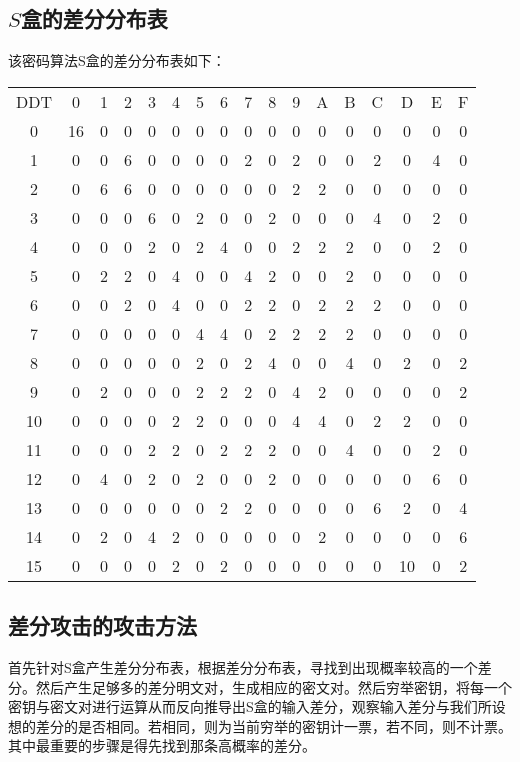 \documentclass{article}
\begin{document}
\subsection*{$S$盒的差分分布表}
该密码算法S盒的差分分布表如下：


\begin{tabular}{ccccccccccccccccc}
DDT &0  &1  &2  &3  &4  &5  &6  &7  &8  &9  &A  &B  &C  &D  &E  &F\\
0   &16 &0  &0  &0  &0  &0  &0  &0  &0  &0  &0  &0  &0  &0  &0  &0\\
1   &0  &0  &6  &0  &0  &0  &0  &2  &0  &2  &0  &0  &2  &0  &4  &0\\
2   &0  &6  &6  &0  &0  &0  &0  &0  &0  &2  &2  &0  &0  &0  &0  &0\\
3   &0  &0  &0  &6  &0  &2  &0  &0  &2  &0  &0  &0  &4  &0  &2  &0\\
4   &0  &0  &0  &2  &0  &2  &4  &0  &0  &2  &2  &2  &0  &0  &2  &0\\
5   &0  &2  &2  &0  &4  &0  &0  &4  &2  &0  &0  &2  &0  &0  &0  &0\\
6   &0  &0  &2  &0  &4  &0  &0  &2  &2  &0  &2  &2  &2  &0  &0  &0\\
7   &0  &0  &0  &0  &0  &4  &4  &0  &2  &2  &2  &2  &0  &0  &0  &0\\
8   &0  &0  &0  &0  &0  &2  &0  &2  &4  &0  &0  &4  &0  &2  &0  &2\\
9   &0  &2  &0  &0  &0  &2  &2  &2  &0  &4  &2  &0  &0  &0  &0  &2\\
10  &0  &0  &0  &0  &2  &2  &0  &0  &0  &4  &4  &0  &2  &2  &0  &0\\
11  &0  &0  &0  &2  &2  &0  &2  &2  &2  &0  &0  &4  &0  &0  &2  &0\\
12  &0  &4  &0  &2  &0  &2  &0  &0  &2  &0  &0  &0  &0  &0  &6  &0\\
13  &0  &0  &0  &0  &0  &0  &2  &2  &0  &0  &0  &0  &6  &2  &0  &4\\
14  &0  &2  &0  &4  &2  &0  &0  &0  &0  &0  &2  &0  &0  &0  &0  &6\\
15  &0  &0  &0  &0  &2  &0  &2  &0  &0  &0  &0  &0  &0  &10 &0  &2

\end{tabular}
\subsection*{差分攻击的攻击方法}
首先针对S盒产生差分分布表，根据差分分布表，寻找到出现概率较高的一个差分。然后产生足够多的差分明文对，生成相应的密文对。然后穷举密钥，将每一个密钥与密文对进行运算从而反向推导出S盒的输入差分，观察输入差分与我们所设想的差分的是否相同。若相同，则为当前穷举的密钥计一票，若不同，则不计票。其中最重要的步骤是得先找到那条高概率的差分。
\end{document}
